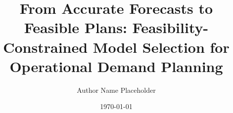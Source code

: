 \documentclass[11pt]{article}
\title{From Accurate Forecasts to Feasible Plans: Feasibility-Constrained Model Selection for Operational Demand Planning}
\author{Author Name Placeholder}
\date{\today}
\begin{document}
\maketitle

\begin{abstract}

\end{abstract}














\end{document}
